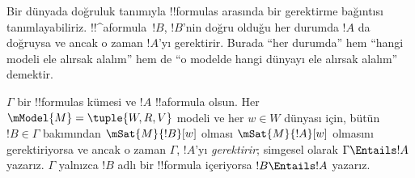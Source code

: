 \documentclass[../../../include/open-logic-section]{subfiles}
\begin{document}


\begin{explain}
  Bir dünyada doğruluk tanımıyla !!{formula}s arasında bir gerektirme
  bağıntısı tanımlayabiliriz. !!^a{formula}~$!B$, $!B$'nin doğru olduğu her
  durumda $!A$ da doğruysa ve ancak o zaman $!A$'yı gerektirir. Burada ``her
  durumda'' hem ``hangi modeli ele alırsak alalım'' hem de ``o modelde hangi
  dünyayı ele alırsak alalım'' demektir.
\end{explain}

\begin{defn}
  $\Gamma$ bir !!{formula}s kümesi ve $!A$ !!a{formula} olsun. Her
  $\mModel{M} = \tuple{W, R, V}$ modeli ve her $w \in W$ dünyası için,
  bütün $!B \in \Gamma$ bakımından $\mSat{M}{!B}[w]$ olması
  $\mSat{M}{!A}[w]$ olmasını gerektiriyorsa ve ancak o zaman $\Gamma$,
  $!A$'yı \emph{gerektirir}; simgesel olarak $\Gamma \Entails !A$ yazarız.
  $\Gamma$ yalnızca $!B$ adlı bir !!{formula} içeriyorsa $!B \Entails !A$
  yazarız.
\end{defn}
\end{document}
